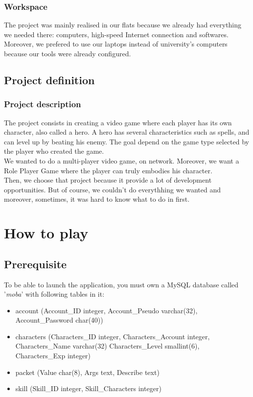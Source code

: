 \documentclass{scrreprt}
\begin{document}
		  \section{Workspace}
		  The project was mainly realised in our flats because we already had everything we needed there:
		  computers, high-speed Internet connection and softwares. Moreover, we prefered to use our laptops
		  instead of university's computers because our tools were already configured.

		  \chapter{Project definition}
		  \section{Project description} %
		  The project consists in creating a video game where each player has its own character, also 
		  called a hero. A hero has several characteristics such as %
		  spells, and can level up by beating his enemy. The goal depend on the game type selected by the player who created the game.\\

		 We wanted to do a multi-player video game, on network. Moreover, we want a Role Player Game where the player can truly embodies his character.\\

		 Then, we choose that project because it provide a lot of development opportunities. But of course, we couldn't do everythhing we wanted and moreover, sometimes, it was hard to know what to do in first.

		  \part{How to play}
		  \chapter{Prerequisite}
		  To be able to launch the application, you must own a MySQL database called '\emph{moba}' with following tables in it:
		  \begin{itemize}
		  \item{account (Account\_ID integer, Account\_Pseudo varchar(32), Account\_Password char(40))}
		  \item{characters (Characters\_ID integer, Characters\_Account integer, Characters\_Name varchar(32) Characters\_Level smallint(6), Characters\_Exp integer)}
		  \item{packet (Value char(8), Args text, Describe text)}
		  \item{skill (Skill\_ID integer, Skill\_Characters integer)}
		  \end{itemize}
\end{document}

